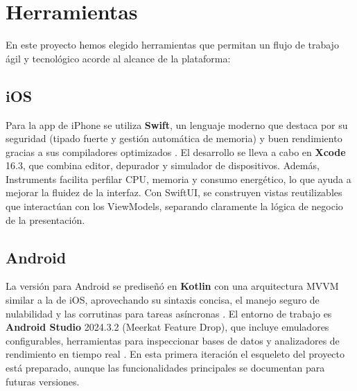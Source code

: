 \section{Herramientas}

\begin{large}

En este proyecto hemos elegido herramientas que permitan un flujo de trabajo ágil y tecnológico acorde al alcance de la plataforma:

\end{large}

\subsection{iOS}

\begin{large}

Para la app de iPhone se utiliza \textbf{Swift}, un lenguaje moderno que destaca por su seguridad (tipado fuerte y gestión automática de memoria) y buen rendimiento gracias a sus compiladores optimizados \cite{swift_lang2025}. El desarrollo se lleva a cabo en \textbf{Xcode} 16.3, que combina editor, depurador y simulador de dispositivos. Además, Instruments facilita perfilar CPU, memoria y consumo energético, lo que ayuda a mejorar la fluidez de la interfaz. Con SwiftUI, se construyen vistas reutilizables que interactúan con los ViewModels, separando claramente la lógica de negocio de la presentación.

\end{large}

\subsection{Android}

\begin{large}

La versión para Android se prediseñó en \textbf{Kotlin} con una arquitectura MVVM similar a la de iOS, aprovechando su sintaxis concisa, el manejo seguro de nulabilidad y las corrutinas para tareas asíncronas \cite{kotlin_lang2025}. El entorno de trabajo es \textbf{Android Studio} 2024.3.2 (Meerkat Feature Drop), que incluye emuladores configurables, herramientas para inspeccionar bases de datos y analizadores de rendimiento en tiempo real \cite{as2024_3_2}. En esta primera iteración el esqueleto del proyecto está preparado, aunque las funcionalidades principales se documentan para futuras versiones.

\end{large}

